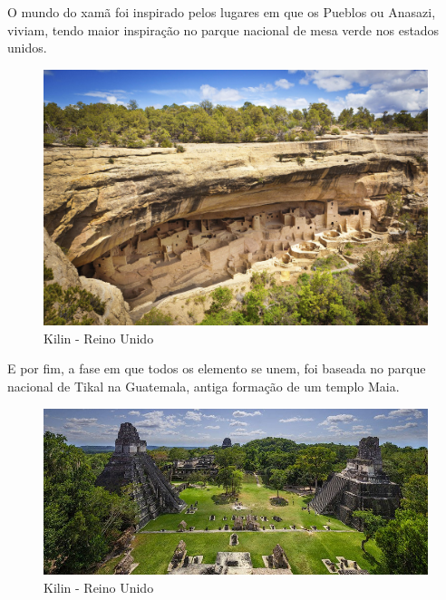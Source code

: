 O mundo do xamã foi inspirado pelos lugares em que os Pueblos ou Anasazi, viviam, tendo maior inspiração no parque nacional de mesa verde nos estados unidos.

\clearpage

\begin{figure}[htb]
    \caption{\label{fig_mundoXaman}Kilin - Reino Unido}
    \begin{center}
        \includegraphics[width=\textwidth/2]{imagens/mesaverde.jpg}
    \end{center}
\end{figure}

E por fim, a fase em que todos os elemento se unem, foi baseada no parque nacional de Tikal na Guatemala, antiga formação de um templo Maia.

\begin{figure}[htb]
    \caption{\label{fig_mundoXaman}Kilin - Reino Unido}
    \begin{center}
        \includegraphics[width=\textwidth/2]{imagens/tikal.jpg}
    \end{center}
\end{figure}

